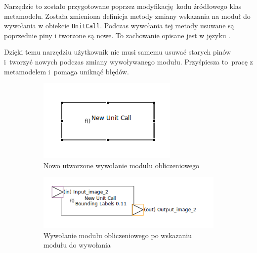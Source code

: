 Narzędzie to zostało przygotowane poprzez modyfikację kodu źródłowego klas
metamodelu. Została zmieniona definicja metody zmiany wskazania na moduł do
wywołania w obiekcie \texttt{UnitCall}. Podczas wywołania tej metody usuwane są
poprzednie piny i tworzone są nowe. To zachowanie opisane jest w języku
\Java{}.

Dzięki temu narzędziu użytkownik nie musi samemu usuwać starych pinów
i~tworzyć nowych podczas zmiany wywoływanego modułu. Przyśpiesza to~pracę z
metamodelem i~pomaga uniknąć błędów.

\begin{figure}
	\centering
	\begin{subfigure}{.3\textwidth}
		\centering
		\includegraphics[width=.99\linewidth]{./images/sirius-desktop-empty-unit-call.png}
		\caption{Nowo utworzone wywołanie modułu obliczeniowego}\label{rys:sirius-desktop-empty-unit-call}
	\end{subfigure}
	\begin{subfigure}{.3\textwidth}
		\centering
		\includegraphics[width=.99\linewidth]{./images/sirius-desktop-change-unit-to-call-before.png}
		\caption{Wywołanie modułu obliczeniowego po wskazaniu modułu do
      wywołania}\label{rys:sirius-desktop-change-unit-to-call-before}
	\end{subfigure}
	\begin{subfigure}{.3\textwidth}

\end{subfigure}
\end{figure}

